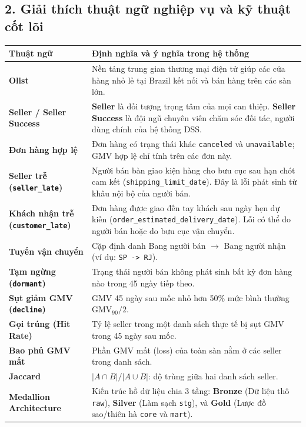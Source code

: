 \subsection*{2. Giải thích thuật ngữ nghiệp vụ và kỹ thuật cốt lõi}
\begin{xltabular}{\textwidth}{|>{\raggedright\arraybackslash}m{4cm}|L|}
\hline
\textbf{Thuật ngữ} & \textbf{Định nghĩa và ý nghĩa trong hệ thống} \\
\hline
\endhead
\textbf{Olist} & Nền tảng trung gian thương mại điện tử giúp các cửa hàng nhỏ lẻ tại Brazil kết nối và bán hàng trên các sàn lớn. \\
\hline
\textbf{Seller / Seller Success} & \textbf{Seller} là đối tượng trọng tâm của mọi can thiệp. \textbf{Seller Success} là đội ngũ chuyên viên chăm sóc đối tác, người dùng chính của hệ thống DSS. \\
\hline
\textbf{Đơn hàng hợp lệ} & Đơn hàng có trạng thái khác \texttt{canceled} và \texttt{unavailable}; GMV hợp lệ chỉ tính trên các đơn này. \\
\hline
\textbf{Seller trễ (\texttt{seller\_late})} & Người bán bàn giao kiện hàng cho bưu cục sau hạn chót cam kết (\texttt{shipping\_limit\_date}). Đây là lỗi phát sinh từ khâu nội bộ của người bán. \\
\hline
\textbf{Khách nhận trễ (\texttt{customer\_late})} & Đơn hàng được giao đến tay khách sau ngày hẹn dự kiến (\texttt{order\_estimated\_delivery\_date}). Lỗi có thể do người bán hoặc do bưu cục vận chuyển. \\
\hline
\textbf{Tuyến vận chuyển} & Cặp định danh Bang người bán $\rightarrow$ Bang người nhận (ví dụ: \texttt{SP -> RJ}). \\
\hline
\textbf{Tạm ngừng (\texttt{dormant})} & Trạng thái người bán không phát sinh bất kỳ đơn hàng nào trong 45 ngày tiếp theo. \\
\hline
\textbf{Sụt giảm GMV (\texttt{decline})} & GMV 45 ngày sau mốc nhỏ hơn 50\% mức bình thường $\text{GMV}_{90}/2$. \\
\hline
\textbf{Gọi trúng (Hit Rate)} & Tỷ lệ seller trong một danh sách thực tế bị sụt GMV trong 45 ngày sau mốc. \\
\hline
\textbf{Bao phủ GMV mất} & Phần GMV mất (loss) của toàn sàn nằm ở các seller trong danh sách. \\
\hline
\textbf{Jaccard} & $|A \cap B| / |A \cup B|$: độ trùng giữa hai danh sách seller. \\
\hline
\textbf{Medallion Architecture} & Kiến trúc hồ dữ liệu chia 3 tầng: \textbf{Bronze} (Dữ liệu thô \texttt{raw}), \textbf{Silver} (Làm sạch \texttt{stg}), và \textbf{Gold} (Lược đồ sao/thiên hà \texttt{core} và \texttt{mart}). \\

\end{xltabular}
